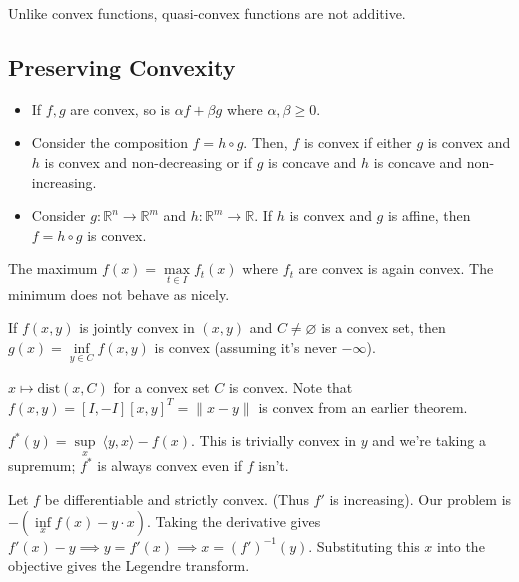 \documentclass[english, 11pt]{article}
\begin{document}
\begin{rem}
Unlike convex functions, quasi-convex functions are not additive.
\end{rem}

\subsection{Preserving Convexity}
\begin{itemize}
\item If $f,g$ are convex, so is $\alpha f + \beta g$ where $\alpha,\beta \ge 0$.

\item Consider the composition $f=h \circ g$. Then, $f$ is convex if either $g$ is convex and $h$ is convex and non-decreasing or if $g$ is concave and $h$ is concave and non-increasing. %

\item Consider $g:\mathbb{R}^n \to \mathbb{R}^m$ and $h:\mathbb{R}^m \to \mathbb{R}$. If $h$ is convex and $g$ is affine, then $f = h \circ g$ is convex.

\end{itemize}

\begin{rem}
The maximum $f(x) = \max \limits_{t \in I} f_t(x)$ where $f_t$ are convex is again convex. The minimum does not behave as nicely.
\end{rem}

\begin{thrm}
If $f(x,y)$ is jointly convex in $(x,y)$ and $C \neq \varnothing$ is a convex set, then $g(x) = \inf \limits_{y \in C} f(x,y)$ is convex (assuming it's never $-\infty$).
\end{thrm}

\begin{exmp}
$x \mapsto \text{dist}(x,C)$ for a convex set $C$ is convex. Note that $f(x,y) = [I,-I] [x,y]^T = \|x-y\|$ is convex from an earlier theorem.
\end{exmp}

\begin{defn}
$f^*(y) = \sup \limits_x \ \langle y,x \rangle - f(x)$. This is trivially convex in $y$ and we're taking a supremum; $f^*$ is always convex even if $f$ isn't.
\end{defn}


\begin{exmp}
Let $f$ be differentiable and strictly convex. (Thus $f'$ is increasing). Our problem is $- \left( \inf \limits_x f(x) - y \cdot x \right)$. Taking the derivative gives $f'(x) -y \implies y=f'(x) \implies x = (f')^{-1}(y)$. Substituting this $x$ into the objective gives the Legendre transform.

 \end{exmp}
 
\end{document}
